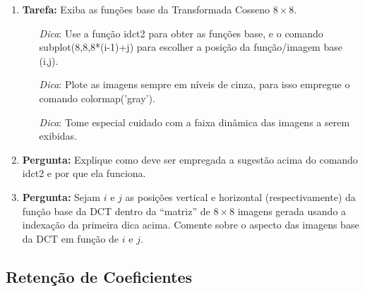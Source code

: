 \documentclass[11pt]{article}
\begin{document}
\begin{enumerate}

\item \textbf{Tarefa:} Exiba as funções base da Transformada Cosseno $8\times 8$.

\begin{enumerate}
\item[\textit{Dica}:] Use a função \textsf{idct2} para obter as funções base, e o comando \textsf{subplot(8,8,8*(i-1)+j)} para escolher a posição da função/imagem base \textsf{(i,j)}.
\item[\textit{Dica}:] Plote as imagens sempre em níveis de cinza, para isso empregue o comando \textsf{colormap('gray')}.
\item[\textit{Dica}:] Tome especial cuidado com a faixa dinâmica das imagens a serem exibidas.
\end{enumerate}

\item \textbf{Pergunta:} Explique como deve ser empregada a sugestão acima do comando \textsf{idct2} e por que ela funciona.

\item \textbf{Pergunta:} Sejam $i$ e $j$ as posições vertical e horizontal (respectivamente) da função base da DCT dentro da ``matriz'' de $8 \times 8$ imagens gerada usando a indexação da primeira dica acima. Comente sobre o aspecto das imagens base da DCT em função de $i$ e $j$.

\end{enumerate}

\subsection{Retenção de Coeficientes}
\end{document}
